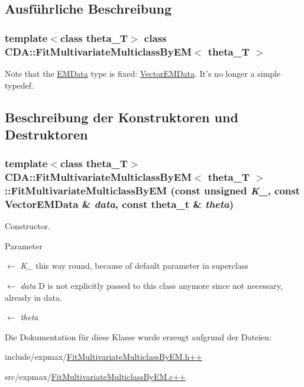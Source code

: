 \subsection{Ausführliche Beschreibung}
\subsubsection*{template$<$class theta\_\-T$>$ class CDA::FitMultivariateMulticlassByEM$<$ theta\_\-T $>$}

Note that the \hyperlink{classCDA_1_1EMData}{EMData} type is fixed: \hyperlink{classCDA_1_1VectorEMData}{VectorEMData}. It's no longer a simple typedef. 

\subsection{Beschreibung der Konstruktoren und Destruktoren}
\hypertarget{classCDA_1_1FitMultivariateMulticlassByEM_ab16e1e3d2592e52801d7ebe94fb8b8d3}{
\subsubsection[{FitMultivariateMulticlassByEM}]{\setlength{\rightskip}{0pt plus 5cm}template$<$class theta\_\-T$>$ {\bf CDA::FitMultivariateMulticlassByEM}$<$ theta\_\-T $>$::{\bf FitMultivariateMulticlassByEM} (const unsigned {\em K\_\-}, \/  const {\bf VectorEMData} \& {\em data}, \/  const theta\_\-t \& {\em theta})}}
\label{classCDA_1_1FitMultivariateMulticlassByEM_ab16e1e3d2592e52801d7ebe94fb8b8d3}


Constructor. 


\begin{DoxyParams}{Parameter}
\item[\mbox{$\leftarrow$} {\em K\_\-}]this way round, because of default parameter in superclass \item[\mbox{$\leftarrow$} {\em data}]D is not explicitly passed to this class anymore since not necessary, already in data. \item[\mbox{$\leftarrow$} {\em theta}]\end{DoxyParams}


Die Dokumentation für diese Klasse wurde erzeugt aufgrund der Dateien:\begin{DoxyCompactItemize}
\item 
include/expmax/\hyperlink{FitMultivariateMulticlassByEM_8h_09_09}{FitMultivariateMulticlassByEM.h++}\item 
src/expmax/\hyperlink{FitMultivariateMulticlassByEM_8c_09_09}{FitMultivariateMulticlassByEM.c++}\end{DoxyCompactItemize}
